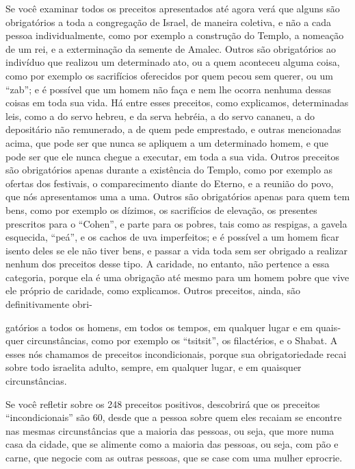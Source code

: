 Se você examinar todos os preceitos apresentados até agora verá que
alguns são obrigatórios a toda a congregação de Israel, de maneira
coletiva, e não a cada pessoa individualmente, como por exemplo a
construção do Tem­plo, a nomeação de um rei, e a exterminação da semente
de Amalec. Outros são obrigatórios ao indivíduo que realizou um
determinado ato, ou a quem acon­teceu alguma coisa, como por exemplo os
sacrifícios oferecidos por quem pe­cou sem querer, ou um ``zab''; e é
possível que um homem não faça e nem lhe ocorra nenhuma dessas coisas em
toda sua vida. Há entre esses preceitos, como explicamos, determinadas
leis, como a do servo hebreu, e da serva he­bréia, a do servo cananeu, a
do depositário não remunerado, a de quem pede emprestado, e outras
mencionadas acima, que pode ser que nunca se apliquem a um determinado
homem, e que pode ser que ele nunca chegue a executar, em toda a sua
vida. Outros preceitos são obrigatórios apenas durante a existên­cia do
Templo, como por exemplo as ofertas dos festivais, o comparecimento
diante do Eterno, e a reunião do povo, que nós apresentamos uma a uma.
Ou­tros são obrigatórios apenas para quem tem bens, como por exemplo os
dízi­mos, os sacrifícios de elevação, os presentes prescritos para o
``Cohen'', e par­te para os pobres, tais como as respigas, a gavela
esquecida, ``peá'', e os cachos de uva imperfeitos; e é possível a um
homem ficar isento deles se ele não tiver bens, e passar a vida toda sem
ser obrigado a realizar nenhum dos preceitos desse tipo. A caridade, no
entanto, não pertence a essa categoria, porque ela é uma obrigação até
mesmo para um homem pobre que vive ele próprio de caridade, como
explicamos. Outros preceitos, ainda, são definitivamente obri-



gatórios a todos os homens, em todos os tempos, em qualquer lugar e em
quais­quer circunstâncias, como por exemplo os ``tsitsit'', os
filactérios, e o Shabat. A esses nós chamamos de preceitos
incondicionais, porque sua obrigatorieda­de recai sobre todo israelita
adulto, sempre, em qualquer lugar, e em quaisquer circunstâncias.

Se você refletir sobre os 248 preceitos positivos, descobrirá que os
preceitos ``incondicionais'' são 60, desde que a pessoa sobre quem eles
recaiam se encontre nas mesmas circunstâncias que a maioria das pessoas,
ou seja, que more numa casa da cidade, que se alimente como a maioria
das pessoas, ou seja, com pão e carne, que negocie com as outras
pessoas, que se case com uma mulher eprocrie.

